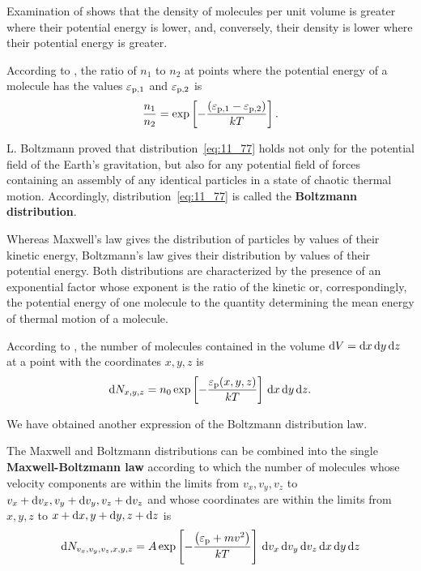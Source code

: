 Examination of  shows that the density of molecules per unit volume is greater where their potential energy is lower, and, conversely, their density is lower where their potential energy is greater.

According to , the ratio of $n_1$ to $n_2$ at points where the potential energy of a molecule has the values $\varepsilon_{\text{p,$1$}}$ and $\varepsilon_{\text{p,$2$}}$ is
\begin{equation}\label{eq:11_78}
	\frac{n_1}{n_2} =  \exp\left[-\frac{\left(\varepsilon_{\text{p,$1$}} - \varepsilon_{\text{p,$2$}}\right)}{kT}\right].
\end{equation}

\noindent
L. Boltzmann proved that distribution~\eqref{eq:11_77} holds not only for the potential field of the Earth's gravitation, but also for any potential field of forces containing an assembly of any identical particles in a state of chaotic thermal motion. Accordingly, distribution~\eqref{eq:11_77} is called the \textbf{Boltzmann distribution}.

Whereas Maxwell's law gives the distribution of particles by values of their kinetic energy, Boltzmann's law gives their distribution by values of their potential energy. Both distributions are characterized by the presence of an exponential factor whose exponent is the ratio of the kinetic or, correspondingly, the potential energy of one molecule to the quantity determining the mean energy of thermal motion of a molecule.

According to , the number of molecules contained in the volume $\mathrm{d} V=\mathrm{d} x\,\mathrm{d} y\,\mathrm{d} z$ at a point with the coordinates $x, y, z$ is
\begin{equation}\label{eq:11_79}
	\mathrm{d} N_{x,y,z} = n_0 \exp\left[-\frac{\varepsilon_{\text{p}}(x,y,z)}{kT}\right]\,\mathrm{d} x\,\mathrm{d} y\,\mathrm{d} z.
\end{equation}

\noindent
We have obtained another expression of the Boltzmann distribution law.

The Maxwell and Boltzmann distributions can be combined into the single \textbf{Maxwell-Boltzmann law} according to which the number of molecules whose velocity components are within the limits from $v_x, v_y, v_z$ to $v_x+\mathrm{d} v_x, v_y+\mathrm{d} v_y, v_z+\mathrm{d} v_z$ and whose coordinates are within the limits from $x, y, z$ to $x+\mathrm{d} x, y+\mathrm{d} y, z+\mathrm{d} z$ is
\begin{equation}\label{eq:11_80}
	\mathrm{d} N_{v_x,v_y,v_z,x,y,z} = A \exp\left[-\frac{\left(\varepsilon_{\text{p}}+mv^2\right)}{kT}\right]\,\mathrm{d} v_x\,\mathrm{d} v_y\,\mathrm{d} v_z\,\mathrm{d} x\,\mathrm{d} y\,\mathrm{d} z
\end{equation}

